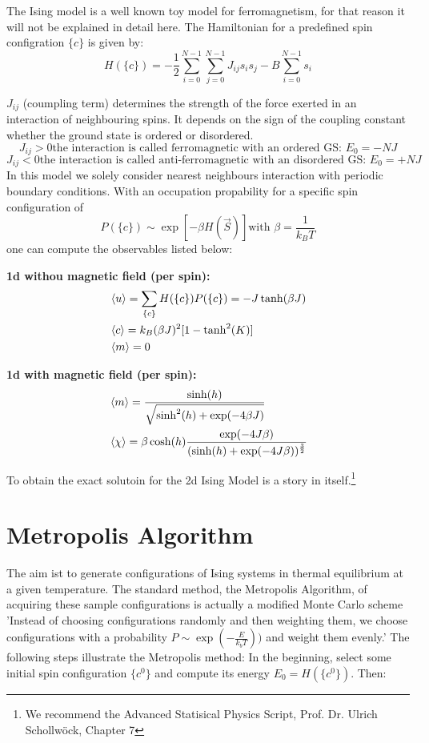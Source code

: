 \documentclass[12pt,a4paper,titlepage]{article}
\begin{document}
The Ising model is a well known toy model for ferromagnetism, for that reason it will not be explained in detail here.
The Hamiltonian for a predefined spin configration $\{c\}$ is given by:
 \[H(\{c\})= - \frac{1}{2}\sum_{i=0}^{N-1} \sum_{j=0}^{N-1} J_{ij} s_i s_j - B \sum_{i=0}^{N-1}s_i\]

$J_{ij}$ (coumpling term) determines the strength of the force exerted in an interaction of neighbouring spins. It depends on the sign of the coupling constant whether the ground state is ordered or disordered. 
\[J_{ij} > 0 \text{the interaction is called ferromagnetic with an ordered GS: } E_0=-NJ\]
\[J_{ij} < 0 \text{the interaction is called anti-ferromagnetic with an disordered GS: } E_0=+NJ\]
In this model we solely consider nearest neighbours interaction with periodic boundary conditions.
With an occupation propability for a specific spin configuration of
\[P(\{c\}) \sim \exp[-\beta H(\vec{S})] \text{with } \beta = \frac{1}{k_B T}\]
one can compute the observables listed below:\newline

\textbf{1d withou magnetic field (per spin):}
\begin{align*}
&\braket{u} = \sum_{\{c\}}H(\{c\})P(\{c\}) = -J \tanh(\beta J)\\
&\braket{c} = k_B(\beta J)^2[1-\tanh^2(K)]\\
&\braket{m} = 0 
\end{align*} 


\textbf{1d with magnetic field (per spin):}
\begin{align*}
&\braket{m} = \frac{\sinh(h)}{\sqrt{\sinh^2(h) + \exp(-4\beta J) }}\\
&\braket{\chi}=\beta \cosh(h) \frac{\exp(-4J\beta)}{(\sinh(h)+\exp(-4J\beta))^{\frac{3}{2}}}
\end{align*}


To obtain the exact solutoin for the 2d Ising Model is a story in itself.\footnote[1]{We recommend the Advanced Statisical Physics Script,
\newline Prof. Dr. Ulrich Schollw\"ock, Chapter 7}







\section{Metropolis Algorithm}

The aim ist to generate configurations of Ising systems in thermal equilibrium at a given temperature. The standard method, the Metropolis Algorithm, of acquiring these sample configurations is actually a modified Monte Carlo scheme 'Instead of choosing configurations randomly and then weighting them, we choose configurations with a probability $P\sim \exp(-\frac{E}{k_b T}))$ and weight them evenly.'\cite{metropolis}\newline
The following steps illustrate the Metropolis method:\newline
In the beginning, select some initial spin configuration $\{c^0\}$ and compute its energy $E_0 = H(\{c^0\})$.
Then:
\end{document}
